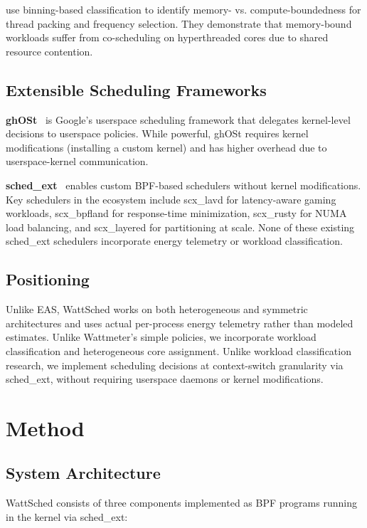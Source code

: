 \documentclass{article}
\begin{document}
\citet{gupta2016workload} use binning-based classification to identify memory- vs. compute-boundedness for thread packing and frequency selection. They demonstrate that memory-bound workloads suffer from co-scheduling on hyperthreaded cores due to shared resource contention.

\subsection{Extensible Scheduling Frameworks}

\textbf{ghOSt}~\citep{humphries2021ghost} is Google's userspace scheduling framework that delegates kernel-level decisions to userspace policies. While powerful, ghOSt requires kernel modifications (installing a custom kernel) and has higher overhead due to userspace-kernel communication.

\textbf{sched\_ext}~\citep{heo2024schedext} enables custom BPF-based schedulers without kernel modifications. Key schedulers in the ecosystem include scx\_lavd for latency-aware gaming workloads, scx\_bpfland for response-time minimization, scx\_rusty for NUMA load balancing, and scx\_layered for partitioning at scale. None of these existing sched\_ext schedulers incorporate energy telemetry or workload classification.

\subsection{Positioning}

Unlike EAS, WattSched works on both heterogeneous and symmetric architectures and uses actual per-process energy telemetry rather than modeled estimates. Unlike Wattmeter's simple policies, we incorporate workload classification and heterogeneous core assignment. Unlike workload classification research, we implement scheduling decisions at context-switch granularity via sched\_ext, without requiring userspace daemons or kernel modifications.

\section{Method}
\label{sec:method}

\subsection{System Architecture}

WattSched consists of three components implemented as BPF programs running in the kernel via sched\_ext:
\end{document}
